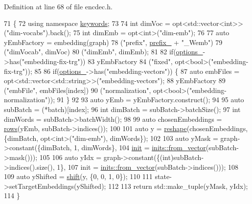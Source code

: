 Definition at line 68 of file encdec.\+h.


\begin{DoxyCode}
71                                                            \{
72     \textcolor{keyword}{using namespace }\hyperlink{namespacekeywords}{keywords};
73 
74     \textcolor{keywordtype}{int} dimVoc = opt<std::vector<int>>(\textcolor{stringliteral}{"dim-vocabs"}).back();
75     \textcolor{keywordtype}{int} dimEmb = opt<int>(\textcolor{stringliteral}{"dim-emb"});
76 
77     \textcolor{keyword}{auto} yEmbFactory = embedding(graph)
78                        (\textcolor{stringliteral}{"prefix"}, \hyperlink{classmarian_1_1DecoderBase_a043a90801b6bda9a45e309607136e947}{prefix\_} + \textcolor{stringliteral}{"\_Wemb"})
79                        (\textcolor{stringliteral}{"dimVocab"}, dimVoc)
80                        (\textcolor{stringliteral}{"dimEmb"}, dimEmb);
81 
82     \textcolor{keywordflow}{if}(\hyperlink{classmarian_1_1DecoderBase_a75375e7661a014fd15bbee3b0a047b91}{options\_}->has(\textcolor{stringliteral}{"embedding-fix-trg"}))
83       yEmbFactory
84         (\textcolor{stringliteral}{"fixed"}, opt<bool>(\textcolor{stringliteral}{"embedding-fix-trg"}));
85 
86     \textcolor{keywordflow}{if}(\hyperlink{classmarian_1_1DecoderBase_a75375e7661a014fd15bbee3b0a047b91}{options\_}->has(\textcolor{stringliteral}{"embedding-vectors"})) \{
87       \textcolor{keyword}{auto} embFiles = opt<std::vector<std::string>>(\textcolor{stringliteral}{"embedding-vectors"});
88       yEmbFactory
89         (\textcolor{stringliteral}{"embFile"}, embFiles[index])
90         (\textcolor{stringliteral}{"normalization"}, opt<bool>(\textcolor{stringliteral}{"embedding-normalization"}));
91     \}
92 
93     \textcolor{keyword}{auto} yEmb = yEmbFactory.construct();
94 
95     \textcolor{keyword}{auto} subBatch = (*batch)[index];
96     \textcolor{keywordtype}{int} dimBatch = subBatch->batchSize();
97     \textcolor{keywordtype}{int} dimWords = subBatch->batchWidth();
98 
99     \textcolor{keyword}{auto} chosenEmbeddings = \hyperlink{namespacemarian_ace1e9a63d52edc363d70d661cf8d0257}{rows}(yEmb, subBatch->indices());
100 
101     \textcolor{keyword}{auto} y = \hyperlink{namespacemarian_acd984f43188d0ae23c2a6ef13ae5293f}{reshape}(chosenEmbeddings, \{dimBatch, opt<int>(\textcolor{stringliteral}{"dim-emb"}), dimWords\});
102 
103     \textcolor{keyword}{auto} yMask = graph->constant(\{dimBatch, 1, dimWords\},
104                                  \hyperlink{amunmt_8cpp_a2e8ddb8bd2f3405f554c9f2c52277f4b}{init} = \hyperlink{namespacemarian_1_1inits_ab9566318ddbacd376c74cdbdfac091e4}{inits::from\_vector}(subBatch->mask()));
105 
106     \textcolor{keyword}{auto} yIdx = graph->constant(\{(int)subBatch->indices().size(), 1\},
107                                 init = \hyperlink{namespacemarian_1_1inits_ab9566318ddbacd376c74cdbdfac091e4}{inits::from\_vector}(subBatch->indices()));
108 
109     \textcolor{keyword}{auto} yShifted = \hyperlink{namespacemarian_a763e5e9b5d5a329d2420fe9bab95476d}{shift}(y, \{0, 0, 1, 0\});
110 
111     state->setTargetEmbeddings(yShifted);
112 
113     \textcolor{keywordflow}{return} std::make\_tuple(yMask, yIdx);
114   \}
\end{DoxyCode}


